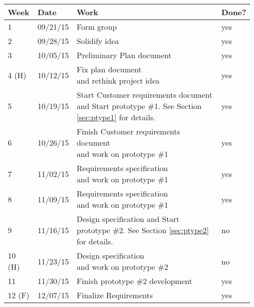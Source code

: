 \begin{table}[H]
\centering
\begin{tabular}{|l|l|l|l|}
\hline
Week 	& Date	 		& Work	 		& 	Done?	 \\ \hline
1		& 09/21/15	 	& Form group		& 	yes		 \\ \hline
2		& 09/28/15	 	& Solidify idea	& 	yes		 \\ \hline
3		& 10/05/15	 	& Preliminary Plan document	& 	yes		 \\ \hline
4 (H)	& 10/12/15	 	& \specialcell{Fix plan document \\ and rethink project idea}	& 			yes \\ \hline
5		& 10/19/15	 	& \specialcell{Start Customer requirements document \\ and Start prototype \#1. See Section \ref{sec:ptype1} for details.}		& 	yes		 \\ \hline
6		& 10/26/15	 	& \specialcell{Finish Customer requirements document \\ and work on prototype \#1}		& 	yes		 \\ \hline	
7		& 11/02/15	 	& \specialcell{Requirements specification \\ and work on prototype \#1} & 	yes		 \\ \hline
8		& 11/09/15	 	& \specialcell{Requirements specification \\and work on prototype \#1}		& 	yes	 \\ \hline
9		& 11/16/15	 	& \specialcell{Design specification and Start \\ prototype \#2. See Section \ref{sec:ptype2} for details.}		& 	no		 \\ \hline
10 (H)	& 11/23/15	 	& \specialcell{Design specification \\ and work on prototype \#2}		& no		 \\ \hline
11		& 11/30/15	 	& Finish prototype \#2 development	& 		yes	 \\ \hline
12 (F)	& 12/07/15	 	& Finalize Requirements		& 	yes		 \\ \hline
\end{tabular}
\end{table}

